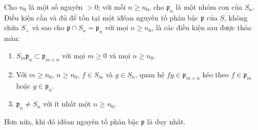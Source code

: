 \documentclass[oneside,10pt]{amsart}
\renewcommand{\geq}{\geqslant}
\let\EGAOriginalLabel\label
\renewcommand{\label}[1]{\phantomsection\EGAOriginalLabel{#1}}
\begin{document}
\begin{proposition}[2.1.9]
\label{II.2.1.9}
Cho $n_0$ là một số nguyên $>0$; với mỗi $n\geq n_0$, cho $\mathfrak{p}_n$ là một nhóm con của $S_n$.
Điều kiện cần và đủ để tồn tại một iđêan nguyên tố phân bậc $\mathfrak{p}$ của $S$, không chứa $S_+$ và sao cho $\mathfrak{p}\cap S_n=\mathfrak{p}_n$ với mọi $n\geq n_0$, là các điều kiện sau được thỏa mãn:
\begin{enumerate}
  \item[{\rm($1^\circ$)}] $S_m\mathfrak{p}_n\subset\mathfrak{p}_{m+n}$ với mọi $m\geq0$ và mọi $n\geq n_0$.
  \item[{\rm($2^\circ$)}] Với $m\geq n_0$, $n\geq n_0$, $f\in S_m$ và $g\in S_n$, quan hệ $fg\in\mathfrak{p}_{m+n}$ kéo theo $f\in\mathfrak{p}_m$ hoặc $g\in\mathfrak{p}_n$.
  \item[{\rm($3^\circ$)}] $\mathfrak{p}_n\neq S_n$ với ít nhất một $n\geq n_0$.
\end{enumerate}
Hơn nữa, khi đó iđêan nguyên tố phân bậc $\mathfrak{p}$ là duy nhất.
\end{proposition}
\end{document}
